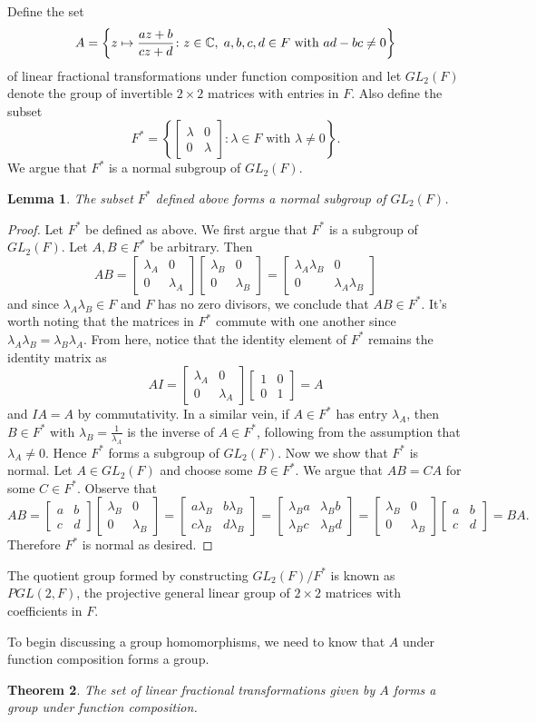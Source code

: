 \documentclass[12pt]{article}
\newcommand{\C}{\mathbb{C}}
\newcommand{\lftmat}[4]{\begin{bmatrix} {#1} & {#2} \\ {#3} & {#4} \end{bmatrix}}
\newcommand{\stanlftmat}{\lftmat{a}{b}{c}{d}}
\newcommand{\ttc}{, \hspace{1mm}}
\theoremstyle{plain}
\newtheorem{theorem}{Theorem}[section]
\newtheorem{lemma}[theorem]{Lemma}
\theoremstyle{definition}
\begin{document}
\begin{appendices}
\noindent Define the set
	\[
		A = \left\lbrace z\mapsto \frac{az + b}{cz + d}\colon z\in\C\ttc a,b,c,d\in F\text{ with } ad - bc \neq 0\right\rbrace
	\]
of linear fractional transformations under function composition and let $GL_2(F)$ denote the group of invertible $2\times 2$ matrices with entries in $F$. Also define the subset
	\[
		F^* = \left\lbrace\lftmat{\lambda}{0}{0}{\lambda}\colon \lambda\in F\text{ with } \lambda\neq 0 \right\rbrace.
	\]
	We argue that $F^*$ is a normal subgroup of $GL_2(F)$.
\begin{lemma}\label{thm:PGL2F}
	The subset $F^*$ defined above forms a normal subgroup of $GL_2(F)$.
\end{lemma}
\begin{proof}
	Let $F^*$ be defined as above. We first argue that $F^*$ is a subgroup of $GL_2(F)$. Let $A,B\in F^*$ be arbitrary. Then
	\[
		AB = \lftmat{\lambda_A}{0}{0}{\lambda_A}\lftmat{\lambda_B}{0}{0}{\lambda_B} = \lftmat{\lambda_A\lambda_B}{0}{0}{\lambda_A\lambda_B}
	\]
	and since $\lambda_A\lambda_B\in F$ and $F$ has no zero divisors, we conclude that $AB\in F^*$. It's worth noting that the matrices in $F^*$ commute with one another since $\lambda_A\lambda_B = \lambda_B\lambda_A$. From here, notice that the identity element of $F^*$ remains the identity matrix as
	\[
		AI = \lftmat{\lambda_A}{0}{0}{\lambda_A}\lftmat{1}{0}{0}{1} = A
	\]
	and $IA = A$ by commutativity. In a similar vein, if $A\in F^*$ has entry $\lambda_A$, then $B\in F^*$ with $\lambda_B = \frac{1}{\lambda_A}$ is the inverse of $A\in F^*$, following from the assumption that $\lambda_A \neq 0$. Hence $F^*$ forms a subgroup of $GL_2(F)$. Now we show that $F^*$ is normal. Let $A\in GL_2(F)$ and choose some $B\in F^*$. We argue that $AB = CA$ for some $C\in F^*$. Observe that
	\[
		AB = \stanlftmat\lftmat{\lambda_B}{0}{0}{\lambda_B} = \lftmat{a\lambda_B}{b\lambda_B}{c\lambda_B}{d\lambda_B} = \lftmat{\lambda_B a}{\lambda_B b}{\lambda_B c}{\lambda_B d} = \lftmat{\lambda_B}{0}{0}{\lambda_B}\stanlftmat = BA.
	\]
	Therefore $F^*$ is normal as desired.
\end{proof}

The quotient group formed by constructing $GL_2(F)/F^*$ is known as $PGL(2,F)$, the projective general linear group of $2\times 2$ matrices with coefficients in $F$.

	To begin discussing a group homomorphisms, we need to know that $A$ under function composition forms a group. 
	
\begin{theorem}
	The set of linear fractional transformations given by $A$ forms a group under function composition.
\end{theorem}


\end{appendices}
\end{document}
